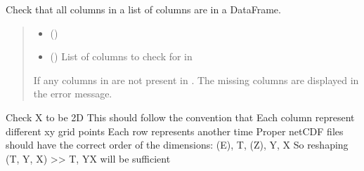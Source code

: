 \documentclass[letterpaper,10pt,english]{sphinxmanual}
\begin{document}
\begin{fulllineitems}
\label{\detokenize{misc:glomar_gridding.utils.check_cols}}
\pysigstartsignatures
\pysiglinewithargsret
{}
{\sphinxparamcomma {}}
{}
\pysigstopsignatures
\sphinxAtStartPar
Check that all columns in a list of columns are in a DataFrame.
\begin{quote}\begin{description}
\begin{itemize}
\item {}
\sphinxAtStartPar
{} ()

\item {}
\sphinxAtStartPar
{} () \textendash{} List of columns to check for in 

\end{itemize}

\sphinxAtStartPar
{\hyperref[\detokenize{misc:glomar_gridding.utils.ColumnNotFoundError}]{}} \textendash{} If any columns in  are not present in . The missing columns
    are displayed in the error message.

\sphinxAtStartPar
{}

\end{description}\end{quote}

\end{fulllineitems}


\begin{fulllineitems}
\label{\detokenize{misc:glomar_gridding.utils.check_shape}}
\pysigstartsignatures
\pysiglinewithargsret
{}
{\sphinxparamcomma {}}
{}
\pysigstopsignatures
\sphinxAtStartPar
Check X to be 2D
This should follow the convention that
Each column represent different xy grid points
Each row represents another time
Proper netCDF files should have the correct order of the dimensions:
(E), T, (Z), Y, X
So reshaping (T, Y, X) \textgreater{}\textgreater{} T, YX will be sufficient

\end{fulllineitems}
\end{document}
